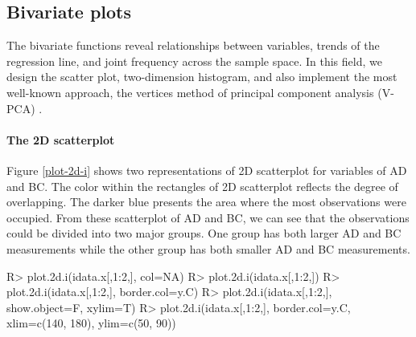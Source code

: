 \documentclass[article]{jss}
\begin{document}
 

\subsection{Bivariate plots}

The bivariate functions reveal relationships between variables, trends of the regression line, and joint frequency across the sample space. In this field, we design the scatter plot, two-dimension histogram, and also implement the most well-known approach, the vertices method of principal component analysis (V-PCA) \cite{cazes1997extension}.




\paragraph{The 2D scatterplot} Figure \ref{plot-2d-i} shows
two representations of 2D scatterplot for variables of AD and
BC. The color within the rectangles of 2D scatterplot
reflects the degree of overlapping. The darker blue
presents the area where the most observations were
occupied. From these scatterplot of AD and BC, we can see
that the observations could be divided into two major
groups. One group has both larger AD and BC measurements
while the other group has both smaller AD and BC measurements.
\begin{CodeChunk}
\begin{CodeInput}
R> plot.2d.i(idata.x[,1:2,], col=NA)
R> plot.2d.i(idata.x[,1:2,])
R> plot.2d.i(idata.x[,1:2,], border.col=y.C)
R> plot.2d.i(idata.x[,1:2,], show.object=F, xylim=T)
R> plot.2d.i(idata.x[,1:2,], border.col=y.C, xlim=c(140, 180), ylim=c(50, 90))
\end{CodeInput}
\end{CodeChunk}




\end{document}
